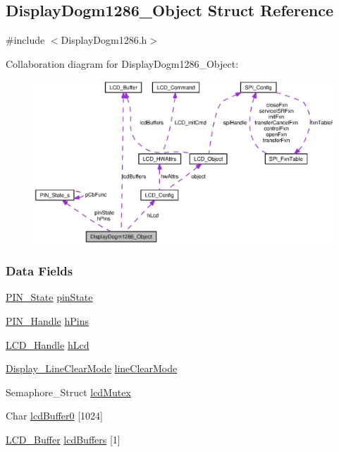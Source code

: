 \subsection{Display\+Dogm1286\+\_\+\+Object Struct Reference}
\label{struct_display_dogm1286___object}


{\ttfamily \#include $<$Display\+Dogm1286.\+h$>$}



Collaboration diagram for Display\+Dogm1286\+\_\+\+Object\+:
\nopagebreak
\begin{figure}[H]
\begin{center}
\leavevmode
\includegraphics[width=350pt]{struct_display_dogm1286___object__coll__graph}
\end{center}
\end{figure}
\subsubsection*{Data Fields}
\begin{DoxyCompactItemize}
\item 
\hyperlink{_p_i_n_8h_a36ef69d50df6baa6973482669c24a522}{P\+I\+N\+\_\+\+State} \hyperlink{struct_display_dogm1286___object_aa6d4c58705d112dce8ab7aa443783b51}{pin\+State}
\item 
\hyperlink{_p_i_n_8h_afb2de52b054638f63c39df1f30a0d88d}{P\+I\+N\+\_\+\+Handle} \hyperlink{struct_display_dogm1286___object_aba88e9b3f2a2c5d65e7ba5a7bbcf86df}{h\+Pins}
\item 
\hyperlink{_l_c_d_dogm1286_8h_a72910a78c343543f1610fd082d17d803}{L\+C\+D\+\_\+\+Handle} \hyperlink{struct_display_dogm1286___object_a8f125a6757c84d28ab81f0abfd6feece}{h\+Lcd}
\item 
\hyperlink{_display_8h_a3d9ab99875c344491227a76f1d47e377}{Display\+\_\+\+Line\+Clear\+Mode} \hyperlink{struct_display_dogm1286___object_a4525973bf6510910127af3b100e1f5bc}{line\+Clear\+Mode}
\item 
Semaphore\+\_\+\+Struct \hyperlink{struct_display_dogm1286___object_a97892f1e0397712d22aad35bccf7924c}{lcd\+Mutex}
\item 
Char \hyperlink{struct_display_dogm1286___object_adf18a6154d387bb4970c07dcaa0236ee}{lcd\+Buffer0} \mbox{[}1024\mbox{]}
\item 
\hyperlink{struct_l_c_d___buffer}{L\+C\+D\+\_\+\+Buffer} \hyperlink{struct_display_dogm1286___object_a965896b532f1b40620ad632b5f509e24}{lcd\+Buffers} \mbox{[}1\mbox{]}
\end{DoxyCompactItemize}


